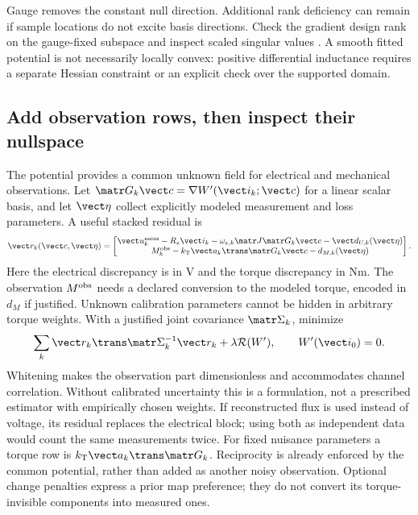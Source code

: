 Gauge removes the constant null direction. Additional rank deficiency can
remain if sample locations do not excite basis directions. Check the gradient
design rank on the gauge-fixed subspace and inspect scaled singular values
\cite{horn2013}. A smooth fitted potential is not necessarily locally convex:
positive differential inductance requires a separate Hessian constraint or
an explicit check over the supported domain.

\subsection{Add observation rows, then inspect their nullspace}
\label{sec:joint-gradient-fit}
The potential provides a common unknown field for electrical and mechanical
observations. Let $\matr G_k\vect c=\nabla W'(\vect i_k;\vect c)$
for a linear scalar basis, and let $\vect\eta$ collect explicitly modeled
measurement and loss parameters. A useful stacked residual is
\begin{equation}
 \vect r_k(\vect c,\vect\eta)=
 \begin{bmatrix}
 \vect u_k^{\rm meas}-R_s\vect i_k-\omega_{e,k}\matr J\matr G_k\vect c
                         -\vect d_{U,k}(\vect\eta)\\
 M_k^{\rm obs}-k_{\rm T}\vect a_k\trans\matr G_k\vect c
                         -d_{M,k}(\vect\eta)
 \end{bmatrix}.
 \label{eq:joint-observation-residual}
\end{equation}
Here the electrical discrepancy is in V and the torque discrepancy in Nm.
The observation $M^{\rm obs}$ needs a declared conversion to the modeled
torque, encoded in $d_M$ if justified. Unknown calibration parameters cannot
be hidden in arbitrary torque weights. With a justified joint covariance
$\matr\Sigma_k$, minimize
\begin{equation}
 \sum_k\vect r_k\trans\matr\Sigma_k^{-1}\vect r_k+
 \lambda\mathcal R(W'),\qquad W'(\vect i_0)=0 .
 \label{eq:joint-observation-fit}
\end{equation}
Whitening makes the observation part dimensionless and accommodates channel
correlation. Without calibrated uncertainty this is a formulation, not a
prescribed estimator with empirically chosen weights. If reconstructed flux
is used instead of voltage, its residual replaces the electrical block;
using both as independent data would count the same measurements twice.
For fixed nuisance parameters a torque row is
$k_{\rm T}\vect a_k\trans\matr G_k$. Reciprocity is already enforced by
the common potential, rather than added as another noisy observation.
Optional change penalties express a prior map preference; they do not
convert its torque-invisible components into measured ones.


